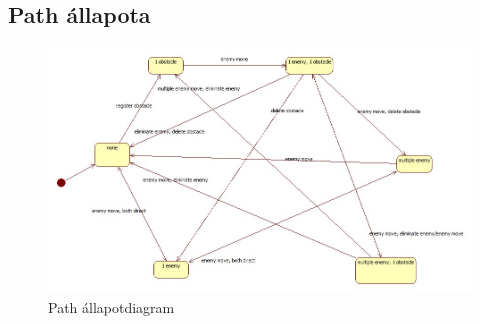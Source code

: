 \subsection{Path állapota}
\begin{figure}[H]
\begin{center}
\includegraphics[width=17cm]{chapters/chapter03/images/StatechartDiagram_Path.jpg}
\caption{Path állapotdiagram}
\label{fig:Path_állapotdiagram}
\end{center}
\end{figure}
